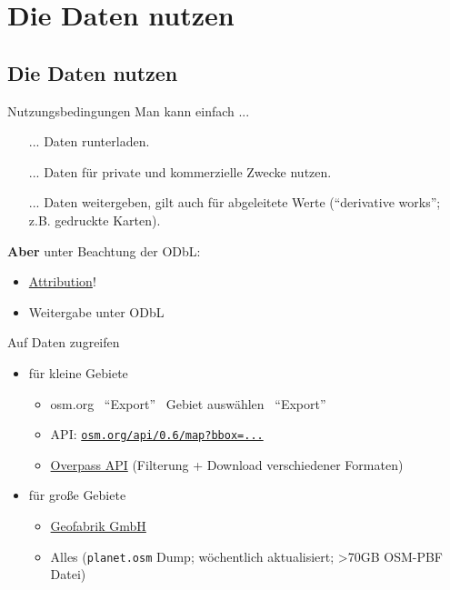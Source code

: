 \documentclass{beamer}
\begin{document}
	\section{Die Daten nutzen}
			
		\begin{frame}
			\tableofcontents[currentsection]
		\end{frame}
		
		\subsection{Die Daten nutzen}
			
			\begin{frame}{Nutzungsbedingungen}
				Man kann einfach ...
				\begin{itemize}
					\item[...] Daten runterladen.
					\item[...] Daten für private und kommerzielle Zwecke nutzen.
					\item[...] Daten weitergeben, gilt auch für abgeleitete Werte (\enquote{derivative works}; z.B. gedruckte Karten).
				\end{itemize}
				\pause
				\vspace{0.25cm}
				\textbf{Aber} unter Beachtung der ODbL:
				\begin{itemize}
					\item \href{https://osmfoundation.org/wiki/Licence/Attribution\_Guidelines}{Attribution}!
					\item Weitergabe unter ODbL
				\end{itemize}
			\end{frame}
			
			\begin{frame}{Auf Daten zugreifen}
				\begin{itemize}
					\item für kleine Gebiete
					\begin{itemize}
						\item osm.org \textrightarrow\ \enquote{Export} \textrightarrow\ Gebiet auswählen \textrightarrow\ \enquote{Export}
						\item API: \href{https://www.openstreetmap.org/api/0.6/map?bbox=9.93116,53.59846,9.93572,53.60052}{\texttt{osm.org/api/0.6/map?bbox=...}}
						\item \href{https://overpass-turbo.eu/}{Overpass API} (Filterung + Download verschiedener Formaten)
					\end{itemize}\pause
					\item für große Gebiete
					\begin{itemize}
						\item \href{https://download.geofabrik.de/}{Geofabrik GmbH}
						\item Alles (\texttt{planet.osm} Dump; wöchentlich aktualisiert; >70GB OSM-PBF Datei)
					\end{itemize}
				\end{itemize}
			\end{frame}
			
\end{document}
